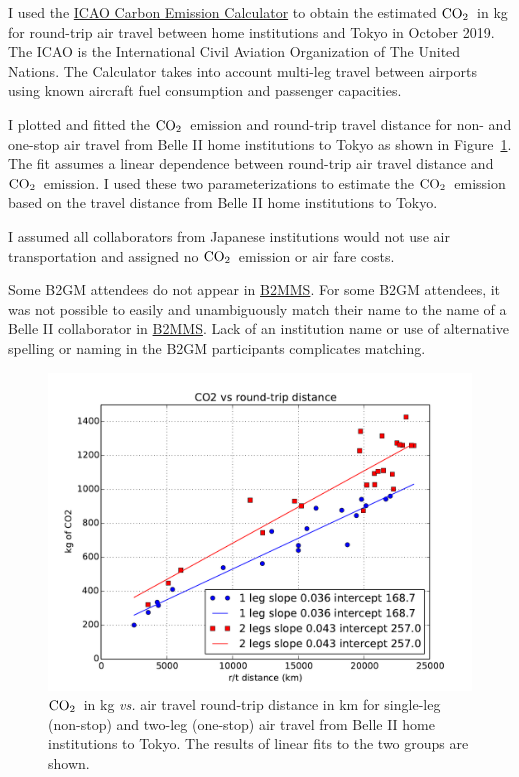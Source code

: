\documentclass[12pt]{article}
\newcommand{\COtwo}{${\rm CO}_2$}
\begin{document}
 I used the  \href{https://www.icao.int/environmental-protection/CarbonOffset/Pages/default.aspx}{\color{blue}ICAO Carbon Emission Calculator} to obtain the estimated \COtwo\ in kg for round-trip air travel between home institutions and Tokyo in October 2019. 
 The ICAO is the International Civil Aviation Organization of The United Nations. 
 The Calculator takes into account multi-leg travel between airports using known aircraft fuel consumption and passenger capacities. 

I plotted and fitted the \COtwo\ emission and round-trip travel distance for non- and one-stop air travel from Belle II home institutions to Tokyo as shown in Figure~\ref{fig:legs}. The fit assumes a linear dependence between round-trip air travel distance and \COtwo\ emission. 
I used these two parameterizations to estimate the \COtwo\ emission based on the travel distance from Belle II home institutions to Tokyo. 

I assumed all collaborators from Japanese institutions would not use air transportation and assigned no \COtwo\ emission or air fare costs.

Some B2GM attendees do not appear in \href{https://b2mms.belle2.org/pls/apex/f?p=1546:18:12868551837158:::::}{\color{blue}B2MMS}. 
For some B2GM attendees, it was not possible to easily and unambiguously match their name to the name of a Belle II collaborator in \href{https://b2mms.belle2.org/pls/apex/f?p=1546:18:12868551837158:::::}{\color{blue}B2MMS}. 
Lack of an institution name or use of alternative spelling or naming in the B2GM participants complicates matching. 

\begin{figure}[htbp]
\begin{center}
\includegraphics[width=\textwidth]{../FIGURES/all_legs.pdf}
\caption{\COtwo\ in kg {\sl vs.} air travel round-trip distance in km for single-leg (non-stop) and two-leg (one-stop) air travel from Belle II home institutions to Tokyo. The results of linear fits to the two groups are shown.}
\label{fig:legs}
\end{center}
\end{figure}
\end{document}
